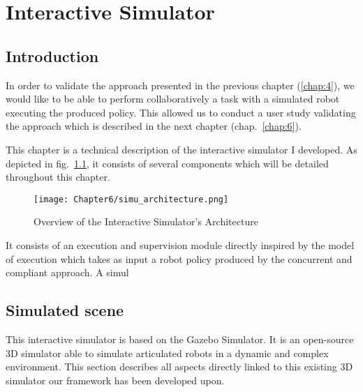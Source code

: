 \ifdefined{}
\else
\setcounter{chapter}{4} %
\dominitoc
\faketableofcontents
\fi

\chapter{Interactive Simulator}
\label{chap:5}
\minitoc

\section{Introduction}

In order to validate the approach presented in the previous chapter (\ref{chap:4}), we would like to be able to perform collaboratively a task with a simulated robot executing the produced policy. This allowed us to conduct a user study validating the approach which is described in the next chapter (chap.~\ref{chap:6}).

This chapter is a technical description of the interactive simulator I developed. As depicted in fig.~\ref{fig:simu_architecture}, it consists of several components which will be detailed throughout this chapter. 

\begin{figure}[h]
    \texttt{[image: Chapter6/simu\_architecture.png]}
    \caption{Overview of the Interactive Simulator's Architecture}
    \label{fig:simu_architecture}
\end{figure}

It consists of an execution and supervision module directly inspired by the model of execution which takes as input a robot policy produced by the concurrent and compliant approach. A simul     


\section{Simulated scene}

This interactive simulator is based on the Gazebo Simulator. It is an open-source 3D simulator able to simulate articulated robots in a dynamic and complex environment.
This section describes all aspects directly linked to this existing 3D simulator our framework has been developed upon.

